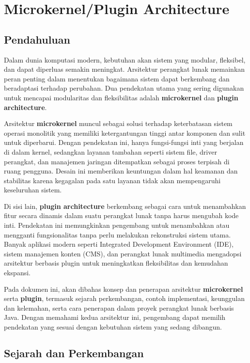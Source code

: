 \chapter{Microkernel/Plugin Architecture}

\section{Pendahuluan}

Dalam dunia komputasi modern, kebutuhan akan sistem yang modular, fleksibel, dan dapat diperluas semakin meningkat. Arsitektur perangkat lunak memainkan peran penting dalam menentukan bagaimana sistem dapat berkembang dan beradaptasi terhadap perubahan. Dua pendekatan utama yang sering digunakan untuk mencapai modularitas dan fleksibilitas adalah \textbf{microkernel} dan \textbf{plugin architecture}.

Arsitektur \textbf{microkernel} muncul sebagai solusi terhadap keterbatasan sistem operasi monolitik yang memiliki ketergantungan tinggi antar komponen dan sulit untuk diperbarui. Dengan pendekatan ini, hanya fungsi-fungsi inti yang berjalan di dalam kernel, sedangkan layanan tambahan seperti sistem file, driver perangkat, dan manajemen jaringan ditempatkan sebagai proses terpisah di ruang pengguna. Desain ini memberikan keuntungan dalam hal keamanan dan stabilitas karena kegagalan pada satu layanan tidak akan mempengaruhi keseluruhan sistem.

Di sisi lain, \textbf{plugin architecture} berkembang sebagai cara untuk menambahkan fitur secara dinamis dalam suatu perangkat lunak tanpa harus mengubah kode inti. Pendekatan ini memungkinkan pengembang untuk menambahkan atau mengganti fungsionalitas tanpa perlu melakukan rekonstruksi sistem utama. Banyak aplikasi modern seperti Integrated Development Environment (IDE), sistem manajemen konten (CMS), dan perangkat lunak multimedia mengadopsi arsitektur berbasis plugin untuk meningkatkan fleksibilitas dan kemudahan ekspansi.

Pada dokumen ini, akan dibahas konsep dan penerapan arsitektur \textbf{microkernel} serta \textbf{plugin}, termasuk sejarah perkembangan, contoh implementasi, keunggulan dan kelemahan, serta cara penerapan dalam proyek perangkat lunak berbasis Java. Dengan memahami kedua arsitektur ini, pengembang dapat memilih pendekatan yang sesuai dengan kebutuhan sistem yang sedang dibangun.

\section{Sejarah dan Perkembangan}

